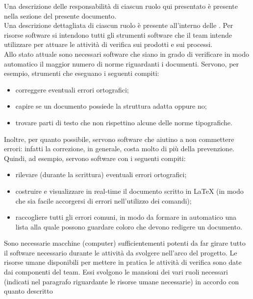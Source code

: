 					Una descrizione delle responsabilità di ciascun ruolo qui presentato è presente nella sezione  del presente documento.\\
					Una descrizione dettagliata di ciascun ruolo è presente all'interno delle .
					Per risorse software si intendono tutti gli strumenti software che il team intende utilizzare per attuare le attività di verifica sui 
					prodotti e sui processi.\\
					Allo stato attuale sono necessari software che siano in grado di verificare in modo automatico il maggior numero di norme riguardanti 
					i documenti. Servono, per esempio, strumenti che eseguano i seguenti compiti:
					\begin{itemize}
						\item correggere eventuali errori ortografici;
						\item capire se un documento possiede la struttura adatta oppure no;
						\item trovare parti di testo che non rispettino alcune delle norme tipografiche.
					\end{itemize}
					Inoltre, per quanto possibile, servono software che aiutino a non commettere errori: infatti la correzione, in generale, costa 
					molto di più della prevenzione. Quindi, ad esempio, servono software con i seguenti compiti:
					\begin{itemize}
						\item rilevare (durante la scrittura) eventuali errori ortografici;
						\item costruire e visualizzare in real-time il documento scritto in \LaTeX{} (in modo che sia facile accorgersi di errori 
						nell'utilizzo dei comandi);
						\item raccogliere tutti gli errori comuni, in modo da formare in automatico una lista alla quale possono guardare coloro che 
						devono redigere un documento. 
					\end{itemize}
					Sono necessarie macchine (computer) sufficientementi potenti da far girare tutto il software necessario durante le attività da
					svolgere nell'arco del progetto.
					Le risorse umane disponibili per mettere in pratica le attività di verifica sono date dai componenti del team. Essi svolgono le 
					mansioni dei vari ruoli necessari (indicati nel paragrafo riguardante le risorse umane necessarie) in accordo con quanto descritto 
